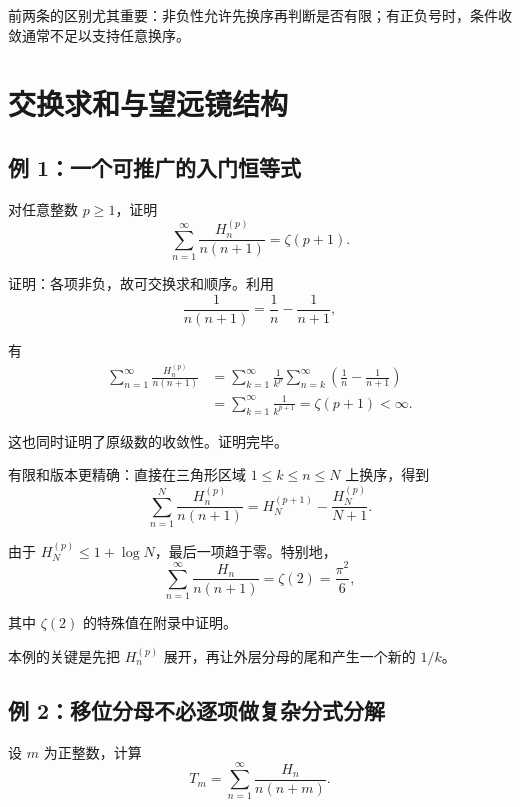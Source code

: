 \documentclass[11pt,a4paper]{article}
\newenvironment{proofblock}{\par\Needspace{4\baselineskip}\noindent}{\par}
\begin{document}
前两条的区别尤其重要：非负性允许先换序再判断是否有限；有正负号时，条件收敛通常不足以支持任意换序。

\hypertarget{sec-3}{%
\section{交换求和与望远镜结构}\label{sec-3}}

\hypertarget{sec-3-1}{%
\subsection{例 1：一个可推广的入门恒等式}\label{sec-3-1}}

对任意整数 \(p\geqslant1\)，证明
\[
\sum_{n=1}^{\infty}\frac{H_n^{(p)}}{n(n+1)}
=\zeta(p+1).
\]

\begin{proofblock}

证明：各项非负，故可交换求和顺序。利用
\[
\frac1{n(n+1)}=\frac1n-\frac1{n+1},
\]

有
\[
\begin{aligned}
\sum_{n=1}^{\infty}\frac{H_n^{(p)}}{n(n+1)}
&=\sum_{k=1}^{\infty}\frac1{k^p}
  \sum_{n=k}^{\infty}\left(\frac1n-\frac1{n+1}\right)\\
&=\sum_{k=1}^{\infty}\frac1{k^{p+1}}
=\zeta(p+1)<\infty.
\end{aligned}
\]

这也同时证明了原级数的收敛性。证明完毕。

\end{proofblock}

有限和版本更精确：直接在三角形区域 \(1\leqslant k\leqslant n\leqslant N\) 上换序，得到
\[
\sum_{n=1}^{N}\frac{H_n^{(p)}}{n(n+1)}
=H_N^{(p+1)}-\frac{H_N^{(p)}}{N+1}.
\]

由于 \(H_N^{(p)}\leqslant1+\log N\)，最后一项趋于零。特别地，
\[
\sum_{n=1}^{\infty}\frac{H_n}{n(n+1)}
=\zeta(2)=\frac{\pi^2}{6},
\]

其中 \(\zeta(2)\) 的特殊值在附录中证明。

本例的关键是先把 \(H_n^{(p)}\) 展开，再让外层分母的尾和产生一个新的 \(1/k\)。

\hypertarget{sec-3-2}{%
\subsection{例 2：移位分母不必逐项做复杂分式分解}\label{sec-3-2}}

设 \(m\) 为正整数，计算
\[
T_m=\sum_{n=1}^{\infty}\frac{H_n}{n(n+m)}.
\]
\end{document}
